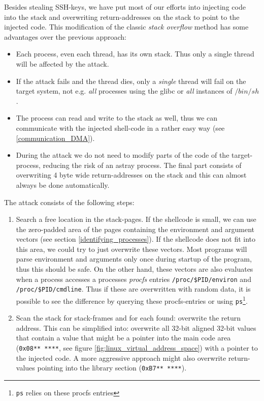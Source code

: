\label{overwriting_stack} Besides stealing SSH-keys, we have put most of our
efforts into injecting code into the stack and overwriting return-addresses on
the stack to point to the injected code. This modification of the classic
\emph{stack overflow} method has some advantages over the previous approach:

\begin{itemize}

	\item Each process, even each thread, has its own stack. Thus only a
		single thread will be affected by the attack.

	\item If the attack fails and the thread dies, only a \emph{single}
		thread will fail on the target system, not e.g. \emph{all}
		processes using the glibc or \emph{all} instances of $/bin/sh$.

	\item The process can read and write to the stack as well, thus we can
		communicate with the injected shell-code in a rather easy way
		(see \ref{communication_DMA}).

	\item During the attack we do not need to modify parts of the code of
		the target-process, reducing the risk of an astray process. The
		final part consists of overwriting 4 byte wide return-addresses
		on the stack and this can almost always be done automatically.

\end{itemize}

The attack consists of the following steps:

\begin{enumerate}

	\item Search a free location in the stack-pages. If the shellcode is
		small, we can use the zero-padded area of the pages containing
		the environment and argument vectors (see section
		\ref{identifying_processes}). If the shellcode does not fit into
		this area, we could try to just overwrite these vectors. Most
		programs will parse environment and arguments only once during
		startup of the program, thus this should be safe. On the other
		hand, these vectors are also evaluates when a process accesses a
		processes \emph{procfs} entries \texttt{/proc/\$PID/environ} and
		\texttt{/proc/\$PID/cmdline}. Thus if these are overwritten with
		random data, it is possible to see the difference by querying
		these procfs-entries or using \texttt{ps}\footnote{\texttt{ps}
		relies on these procfs entries}.


	\item Scan the stack for stack-frames and for each found: overwrite the
		return address. This can be simplified into: overwrite all
		32-bit aligned 32-bit values that contain a value that might be
		a pointer into the main code area (\texttt{0x08**~****}, see
		figure \ref{fig:linux_virtual_address_space}) with a pointer to
		the injected code.  A more aggressive approach might also
		overwrite return-values pointing into the library section
		(\texttt{0xB7**~****}).

\end{enumerate}

